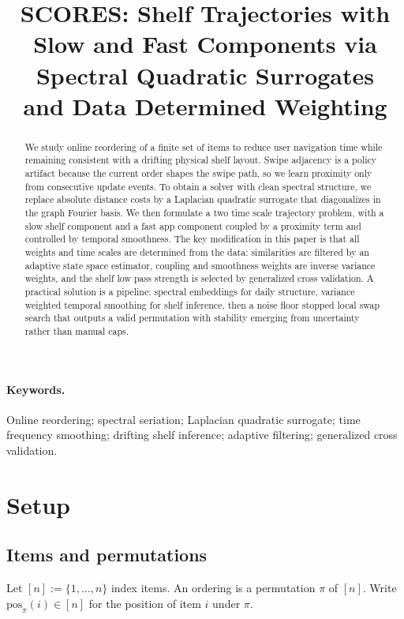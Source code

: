 \documentclass[11pt]{article}
\title{SCORES: Shelf Trajectories with Slow and Fast Components via Spectral Quadratic Surrogates \\ and Data Determined Weighting}
\author{}
\date{}
\begin{document}
\maketitle

\begin{abstract}
We study online reordering of a finite set of items to reduce user navigation time while remaining consistent with a drifting physical shelf layout.
Swipe adjacency is a policy artifact because the current order shapes the swipe path, so we learn proximity only from consecutive update events.
To obtain a solver with clean spectral structure, we replace absolute distance costs by a Laplacian quadratic surrogate that diagonalizes in the graph Fourier basis.
We then formulate a two time scale trajectory problem, with a slow shelf component and a fast app component coupled by a proximity term and controlled by temporal smoothness.
The key modification in this paper is that all weights and time scales are determined from the data: similarities are filtered by an adaptive state space estimator, coupling and smoothness weights are inverse variance weights, and the shelf low pass strength is selected by generalized cross validation.
A practical solution is a pipeline: spectral embeddings for daily structure, variance weighted temporal smoothing for shelf inference, then a noise floor stopped local swap search that outputs a valid permutation with stability emerging from uncertainty rather than manual caps.
\end{abstract}

\paragraph{Keywords.}
Online reordering; spectral seriation; Laplacian quadratic surrogate; time frequency smoothing; drifting shelf inference; adaptive filtering; generalized cross validation.

\tableofcontents
\bigskip

\section{Setup}
\subsection{Items and permutations}
Let $[n]:=\{1,\dots,n\}$ index items.
An ordering is a permutation $\pi$ of $[n]$.
Write $\mathrm{pos}_{\pi}(i)\in[n]$ for the position of item $i$ under $\pi$.
\end{document}
